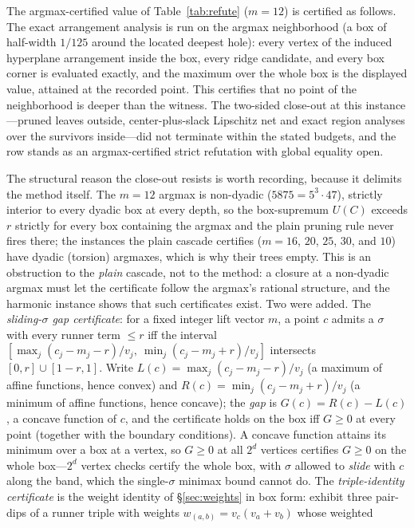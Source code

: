 The argmax-certified value of Table~\ref{tab:refute} ($m=12$) is
certified as follows. The exact arrangement analysis is run on the
argmax neighborhood (a box of half-width $1/125$ around the located
deepest hole): every vertex of the induced hyperplane arrangement
inside the box, every ridge candidate, and every box corner is
evaluated exactly, and the maximum over the whole box is the displayed
value, attained at the recorded point. This certifies that no point of
the neighborhood is deeper than the witness. The two-sided close-out at
this instance---pruned leaves outside, center-plus-slack Lipschitz net
and exact region analyses over the survivors inside---did not
terminate within the stated budgets, and the row stands as an
argmax-certified strict refutation with global equality open.

The structural reason the close-out resists is worth recording, because
it delimits the method itself. The $m=12$ argmax is non-dyadic
($5875=5^3\cdot47$), strictly interior to every dyadic box at every
depth, so the box-supremum $U(C)$ exceeds $r$ strictly for every box
containing the argmax and the plain pruning rule never fires there;
the instances the plain cascade certifies ($m=16$, $20$, $25$, $30$,
and $10$) have dyadic (torsion) argmaxes, which is why their trees
empty. This is an obstruction to the \emph{plain} cascade, not to the
method: a closure at a non-dyadic argmax must let the certificate
follow the argmax's rational structure, and the harmonic instance
shows that such certificates exist. Two were added. The
\emph{sliding-$\sigma$ gap certificate}: for a fixed integer lift
vector $m$, a point $c$ admits a $\sigma$ with every runner term $\le
r$ iff the interval
$[\max_j (c_j-m_j-r)/v_j,\ \min_j (c_j-m_j+r)/v_j]$ intersects
$[0,r]\cup[1-r,1]$. Write $L(c)=\max_j(c_j-m_j-r)/v_j$ (a maximum of
affine functions, hence convex) and $R(c)=\min_j(c_j-m_j+r)/v_j$ (a
minimum of affine functions, hence concave); the \emph{gap} is
$G(c)=R(c)-L(c)$, a concave function of $c$, and the certificate holds
on the box iff $G\ge0$ at every point (together with the boundary
conditions). A concave function attains its minimum over a box at a
vertex, so $G\ge0$ at all $2^d$ vertices certifies $G\ge0$ on the whole
box---$2^d$ vertex checks certify the whole box, with $\sigma$ allowed
to \emph{slide} with $c$ along the band, which the single-$\sigma$
minimax bound cannot do. The \emph{triple-identity certificate} is the weight
identity of \S\ref{sec:weights} in box form: exhibit three pair-dips of
a runner triple with weights $w_{(a,b)}=v_c(v_a{+}v_b)$ whose weighted
